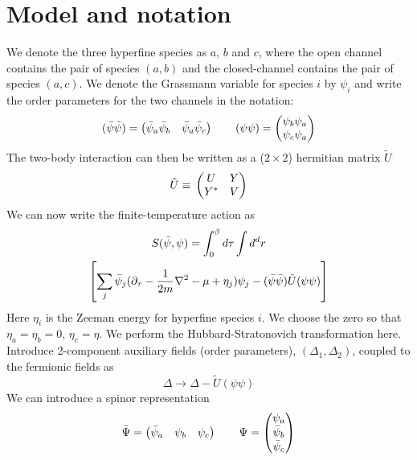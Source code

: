 \documentclass[reprint,pra]{revtex4-1}
\begin{document}
\section{Model and notation\label{sec:model}}
We denote the three hyperfine species as $a$, $b$ and $c$, where the open channel contains the pair of species $(a,b)$ and the closed-channel contains the pair of species $(a,c)$.  We denote the Grassmann variable for species $i$ by $\psi_i$ and write the order parameters for the two channels in the notation:
\begin{equation}
(\bar\psi\bar\psi)=\begin{pmatrix}\bar\psi_{a}\bar\psi_{b}&\bar\psi_{a}\bar\psi_{c}\end{pmatrix}
\qquad(\psi\psi)=\begin{pmatrix}\psi_{b}\psi_{a}\\\psi_{c}\psi_{a}\end{pmatrix}
\end{equation}
The two-body interaction can then be written as a ($2\times2$)  hermitian  matrix  $\tilde{U}$ 
\begin{equation}
\tilde{U}\equiv{}\begin{pmatrix}U&Y\\Y^{*}&V\end{pmatrix}
\end{equation}
We can now write the finite-temperature action as 
\begin{multline}\label{eq:pathInt2:actionFermi}
S(\bar\psi,\psi)=\int^{\beta}_{0}d\tau\int{d^{d}r}\\
\left[\sum_{j}\bar\psi_{j}(\partial_\tau-\frac{1}{2m}\nabla^{2}-\mu+\eta_{j})\psi_{j}
-(\bar\psi\bar\psi)\tilde{U}(\psi\psi)\right]
\end{multline}
Here $\eta_{i}$ is the Zeeman energy for hyperfine species $i$. We choose the zero so that $\eta_{a}=\eta_{b}=0$, $\eta_{c}=\eta$.  We  perform the Hubbard-Stratonovich transformation here.   Introduce 2-component  auxiliary fields (order parameters), $(\Delta_{1},\Delta_{2})$, coupled to the fermionic fields as 
\begin{equation}\label{eq:pathInt2:DeltaPhi}
\Delta\longrightarrow\Delta-\tilde{U}(\psi\psi)
\end{equation}
We can introduce  a spinor representation   
\begin{equation}
\bar\Psi=\begin{pmatrix}\bar\psi_{a}&\psi_{b}&\psi_{c}\end{pmatrix}\qquad\Psi=\begin{pmatrix}\psi_{a}\\\bar\psi_{b}\\\bar\psi_{c}\end{pmatrix}
\end{equation}
\end{document}
